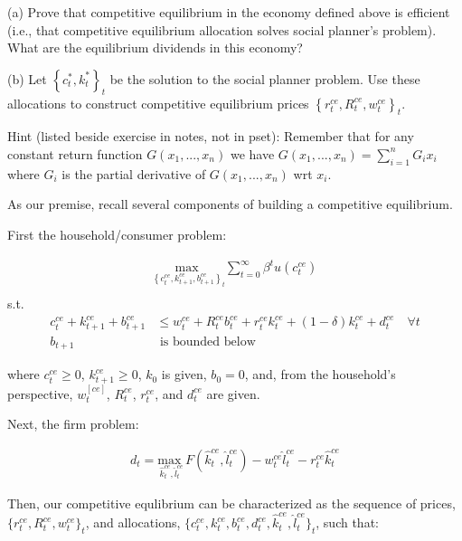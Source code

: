 (a) Prove that competitive equilibrium in the economy defined above is efficient (i.e., that competitive equilibrium allocation solves social planner's problem). What are the equilibrium dividends in this economy?

(b) Let $\left\{c_t^*, k_t^*\right\}_t$ be the solution to the social planner problem. Use these allocations to construct competitive equilibrium prices $\left\{r_t^{c e}, R_t^{c e}, w_t^{c e}\right\}_t$.

Hint (listed beside exercise in notes, not in pset):
Remember that for any constant return function $G(x_1, ..., x_n)$
we have $G(x_1, ..., x_n) = \sum_{i=1}^n G_ix_i$
where $G_i$ is the partial derivative of $G(x_1, ..., x_n)$ wrt $x_i$.


As our premise, recall several components of building a competitive equilibrium.

First the household/consumer problem:

\begin{align}
    \underset{\left\{c_t^{ce}, k_{t+1}^{ce}, b_{t+1}^{ce}\right\}_t}{\text{max }} \sum_{t=0}^\infty \beta^t u(c_t^{ce}) \\
\end{align}
s.t.
\begin{align}
    c_t^{ce} + k_{t+1}^{ce} + b_{t+1}^{ce} &\leq w_t^{ce} + R_t^{ce}b_t^{ce} + r_t^{ce}k_t^{ce} + (1 - \delta)k_t^{ce} + d_t^{ce} \quad \forall t \label{eq:pset_2023_24_ps1_q3_golosov_hh_budget_constraint} \\
    b_{t+1} &\text{ is bounded below}
\end{align}

where $c_t^{ce} \geq 0$, $k_{t+1}^{ce} \geq 0$, $k_0$ is given, $b_0 = 0$,
and, from the household's perspective, $w_t^[ce]$, $R_t^{ce}$, $r_t^{ce}$, and $d_t^{ce}$ are given.

Next, the firm problem:

\begin{align}
    d_t = \underset{\hat{k}_t^{ce}, \hat{l}_t^{ce}}{\text{max }} F(\hat{k}_t^{ce}, \hat{l}_t^{ce}) - w_t^{ce}\hat{l}_t^{ce} - r_t^{ce}\hat{k}_t^{ce} \label{eq:pset_2023_24_ps1_q3_golosov_firm_problem}
\end{align}

Then, our competitive equlibrium can be characterized as the 
sequence of prices, $\{r_t^{ce}, R_t^{ce}, w_t^{ce}\}_t$,
and allocations, $\{c_t^{ce}, k_{t}^{ce}, b_{t}^{ce}, d_t^{ce}, \hat{k}_t^{ce}, \hat{l}_t^{ce}\}_t$,
such that:

